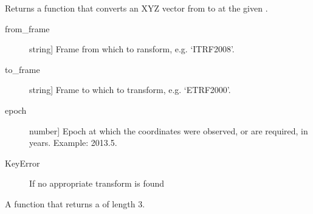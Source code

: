 \documentclass[a4paper,10pt,english]{sphinxmanual}
\begin{document}
\begin{fulllineitems}
\label{\detokenize{api-docs:etrsitrs.main.convert_fn}}
Returns a function  that converts an XYZ
vector from  to  at the given .

\begin{description}
\item[{from\_frame}] \leavevmode{[}string{]}
Frame from which to ransform, e.g. ‘ITRF2008’.

\item[{to\_frame}] \leavevmode{[}string{]}
Frame to which to transform, e.g. ‘ETRF2000’.

\item[{epoch}] \leavevmode{[}number{]}
Epoch at which the coordinates were observed, or are
required, in years. Example: 2013.5.

\end{description}

\begin{description}
\item[{KeyError}] \leavevmode
If no appropriate transform is found

\end{description}


A function  that returns a  of length 3.


\begin{sphinxVerbatim}[commandchars=\\\{\}]
  \PYG{p}{[}  \PYG{p}{]}
    
  
\end{sphinxVerbatim}

\end{fulllineitems}
\end{document}
